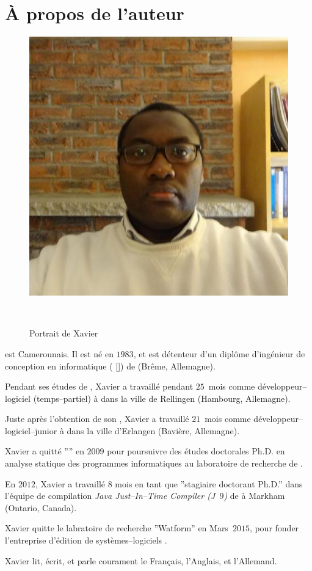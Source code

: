 \chapter*{\`A propos de l'auteur}\label{chap:biography}

\begin{figure}[!htpb]
\centering
\includegraphics[scale=0.63]{images/XavierNOUNDOU-2}
\caption{Portrait de Xavier}~\label{fig:xaviernoumbis}
\end{figure}

 est Camerounais.
Il est n\'e en $1983$, et est d\'etenteur d'un
dipl\^ome d'ing\'enieur de conception en informatique
(\emph{\diplominformatiker} [\diplinf]) de
 (Br\^eme, Allemagne).

Pendant ses \'etudes de \diplinf,
Xavier a travaill\'e pendant $25$~mois comme
d\'eveloppeur--logiciel (temps--partiel) \`a
\company{\bergmann} dans la ville de Rellingen
(Hambourg, Allemagne).

Juste apr\`es l'obtention de son \diplinf,
Xavier a travaill\'e $21$~mois comme d\'eveloppeur--logiciel--junior
\`a \company{\siemens} dans la ville d'Erlangen
(Bavi\`ere, Allemagne).

Xavier a quitt\'e ''\siemens'' en $2009$ pour poursuivre
des \'etudes doctorales Ph.D. en analyse statique des programmes
informatiques au laboratoire de recherche 
de .

En $2012$, Xavier a travaill\'e $8$ mois en tant
que ''stagiaire doctorant Ph.D.'' dans l'\'equipe
de compilation \emph{Java Just--In--Time Compiler (J~$9$)}
de  \`a Markham (Ontario, Canada).

Xavier quitte le labratoire de recherche ''Watform''
en Mars~$2015$, pour fonder l'entreprise d'\'edition
de syst\`emes--logiciels \textbf{\yerenlabs}.

Xavier lit, \'ecrit, et parle courament le Fran\c{c}ais,
l'Anglais, et l'Allemand.
